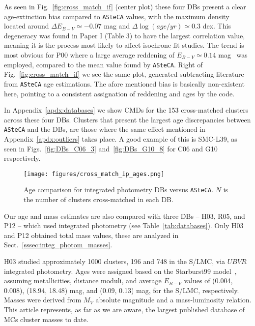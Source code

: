 \documentclass[draft]{aa}
\begin{document}
As seen in Fig.~\ref{fig:cross_match_if} (center plot) these four DBs
present a clear age-extinction bias compared to \texttt{ASteCA} values, with the
maximum density located around $\Delta E_{B-V}{\simeq-}0.07$ mag and
$\Delta\log(age/yr){\simeq}0.3$ dex.
This degeneracy was found in Paper I (Table 3) to have the largest
correlation value, meaning it is the process most likely to affect isochrone fit
studies.
The trend is most obvious for P00 where a large average reddening of
$E_{B-V}{\simeq}0.14$ mag~\citep{de_Grijs_2006} was employed, compared to the
mean value found by \texttt{ASteCA}.
%
Right of Fig.~\ref{fig:cross_match_if} we see the same plot,
generated subtracting literature from \texttt{ASteCA} age estimations.
The afore mentioned bias is basically non-existent here, pointing to a
consistent assignation of reddening and ages by the code.

In Appendix~\ref{apdx:databases} we show CMDs for the 153 cross-matched
clusters across these four DBs.
Clusters that present the largest age discrepancies between
\texttt{ASteCA} and the DBs, are those where the same effect mentioned in
Appendix~\ref{apdx:outliers} takes place. A good example of this is SMC-L39, as
seen in Figs.~\ref{fig:DBs_C06_3} and~\ref{fig:DBs_G10_8} for C06 and G10
respectively.\\


%

\begin{figure}
\centering
\texttt{[image: figures/cross\_match\_ip\_ages.png]}
\caption{Age comparison for integrated photometry DBs versus \texttt{ASteCA}.
$N$ is the number of clusters cross-matched in each DB.\@}
\label{fig:cross_match_ip_age}
\end{figure}

Our age and mass estimates are also compared with three DBs -- H03, R05, and P12
-- which used integrated photometry (see Table~\ref{tab:databases}). Only H03
and P12 obtained total mass values, these are analyzed in
Sect.~\ref{sssec:integ_photom_masses}.

H03 studied approximately 1000 clusters, 196 and 748 in the S/LMC, via $UBVR$
integrated photometry.
Ages were assigned based on the Starburst99
model~\citep{Leitherer_1999}, assuming metallicities, distance moduli, and
average $E_{B-V}$ values of (0.004, 0.008), (18.94, 18.48) mag, and 
(0.09, 0.13) mag, for the S/LMC, respectively.
%
Masses were derived from $M_V$ absolute magnitude and a mass-luminosity
relation.
This article represents, as far as we are aware, the largest published database
of MCs cluster masses to date.
\end{document}

